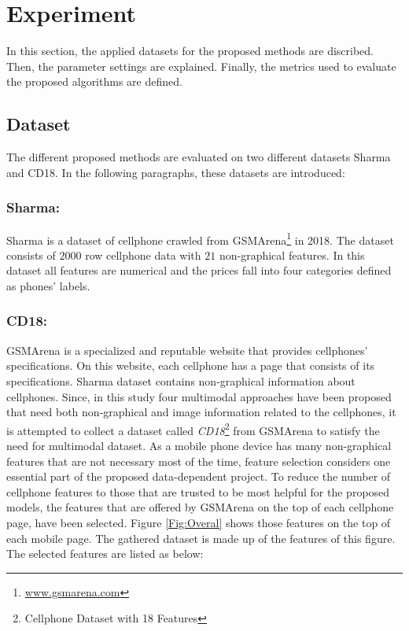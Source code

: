 \documentclass{svjour3}                     \smartqed  \usepackage{graphicx}
\begin{document}
\section{Experiment} \label{Sec:Experiments}
In this section, the applied datasets for the proposed methods are discribed. Then, the parameter settings are explained. Finally, the metrics used to evaluate the proposed algorithms are defined.

\subsection{Dataset} \label{Subsuc:Dataset}
The different proposed methods are evaluated on two different datasets Sharma and CD18. In the following paragraphs, these datasets are introduced:

\subsubsection*{\textbf{Sharma}:} Sharma \cite{Sharma}  is a dataset of cellphone crawled from GSMArena\footnote{\url{www.gsmarena.com}} in 2018. The dataset consists of $2000$ row cellphone data with $21$ non-graphical features. In this dataset all features are numerical and  the prices fall into four categories defined as phones' labels.

\subsubsection*{\textbf{CD18}:} GSMArena is a specialized and reputable website that provides cellphones' specifications. On this website, each cellphone has a page that consists of its specifications.
Sharma dataset contains non-graphical information about cellphones. Since, in this study four multimodal approaches have been proposed that need both non-graphical and image information related to the cellphones, it is attempted to collect a dataset called \textit{CD18}\footnote{Cellphone Dataset with 18 Features} from GSMArena to satisfy the need for multimodal dataset. As a mobile phone device has many non-graphical features that are not necessary most of the time, feature selection considers one essential part of the proposed data-dependent project. To reduce the number of cellphone features to those that are trusted to be most helpful for the proposed models, the features that are offered by GSMArena on the top of each cellphone page, have been selected. Figure \ref{Fig:Overal} shows those features on the top of each mobile page. The gathered dataset is made up of the features of this figure. The selected features are listed as below:
\end{document}
